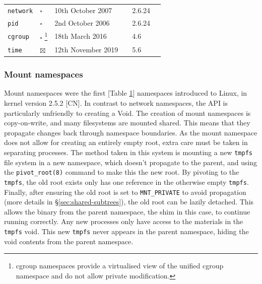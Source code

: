 \documentclass[sigplan]{acmart}
\begin{document}
\begin{table}
\begin{minipage}{\textwidth}
\begin{center}
\begin{tabular}{l|l|lc|lc}
        \texttt{network}
            & $\square$
            & 10th October 2007 & \citep{biederman_net_2007}
            & 2.6.24 & \citep{noauthor_linux_2008} \\

        \texttt{pid}
            & $\square$
            & 2nd October 2006 & \citep{bhattiprolu_patch_2006}
            & 2.6.24 & \citep{noauthor_linux_2008} \\

        \texttt{cgroup}
            & $\square$ \footnote{cgroup namespaces provide a virtualised view of the unified cgroup namespace and do not allow private modification.}
            & 18th March 2016 & \citep{heo_git_2016}
            & 4.6 & \citep{torvalds_linux_2016} \\

        \texttt{time}
            & $\boxtimes$
            & 12th November 2019 & \citep{vagin_ns_2020}
            & 5.6 & \citep{noauthor_linux_2020}

    \end{tabular}
    \end{center}
    \end{minipage}
    
    \label{tab:namespaces}
\end{table}

\subsubsection{Mount namespaces}

Mount namespaces were the first [Table \ref{tab:namespaces}] namespaces introduced to Linux, in kernel version 2.5.2 [CN]. In contrast to network namespaces, the API is particularly unfriendly to creating a Void. The creation of mount namespaces is copy-on-write, and many filesystems are mounted shared. This means that they propagate changes back through namespace boundaries. As the mount namespace does not allow for creating an entirely empty root, extra care must be taken in separating processes. The method taken in this system is mounting a new \texttt{tmpfs} file system in a new namespace, which doesn't propagate to the parent, and using the \texttt{pivot\_root(8)} command to make this the new root. By pivoting to the \texttt{tmpfs}, the old root exists only has one reference in the otherwise empty \texttt{tmpfs}. Finally, after ensuring the old root is set to \texttt{MNT\_PRIVATE} to avoid propagation (more details in §\ref{sec:shared-subtrees}), the old root can be lazily detached. This allows the binary from the parent namespace, the shim in this case, to continue running correctly. Any new processes only have access to the materials in the \texttt{tmpfs} void. This new \texttt{tmpfs} never appears in the parent namespace, hiding the void contents from the parent namespace.
\end{document}
